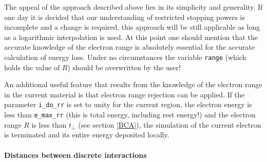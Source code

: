 The appeal of the approach described above lies in its simplicity
and generality. If one day it is decided that our understanding
of restricted stopping powers is incomplete and a change
is required, this approach will be still applicable as long
as a logarithmic interpolation is used. At this point one
should mention that the accurate knowledge of the electron range
is absolutely essential for the accurate calculation of
energy loss. Under no circumstances the variable
{\tt range} (which holds the value of $R$)
should be overwritten by the user!

An additional useful feature that results from the knowledge
of the electron range in the current material is that
electron range rejection can be applied. If the parameter
{\tt i\_do\_rr} is set to unity for the current region,
the electron energy is less than {\tt e\_max\_rr} (this
is total energy, including rest energy!) and the electron
range $R$ is less than $t_\perp$ (see section \ref{BCA}),
the simulation of the current electron is terminated and its entire energy
deposited locally.

\paragraph{Distances between discrete interactions} \hfill
\label{eloss_evaluation}

